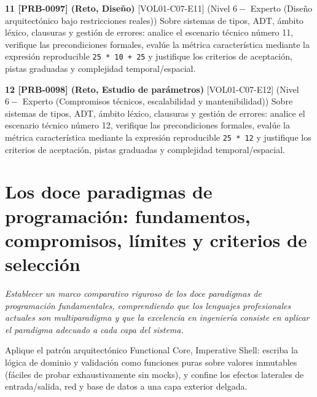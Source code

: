 \documentclass{book}
\begin{document}
\begin{tcolorbox}[title={Ejercicios}, studiumworked, breakable]
\noindent\textbf{11 [PRB-0097] (Reto, Diseño)}
[VOL01-C07-E11] (Nivel \(6 -\) Experto (Diseño arquitectónico bajo restricciones reales)) Sobre sistemas de tipos, ADT, ámbito léxico, clausuras y gestión de errores: analice el escenario técnico número 11, verifique las precondiciones formales, evalúe la métrica característica mediante la expresión reproducible \texttt{25 * 10 + 25} y justifique los criterios de aceptación, pistas graduadas y complejidad temporal/espacial.

\noindent\textbf{12 [PRB-0098] (Reto, Estudio de parámetros)}
[VOL01-C07-E12] (Nivel \(6 -\) Experto (Compromisos técnicos, escalabilidad y mantenibilidad)) Sobre sistemas de tipos, ADT, ámbito léxico, clausuras y gestión de errores: analice el escenario técnico número 12, verifique las precondiciones formales, evalúe la métrica característica mediante la expresión reproducible \texttt{25 * 12} y justifique los criterios de aceptación, pistas graduadas y complejidad temporal/espacial.
\end{tcolorbox}

\chapter{Los doce paradigmas de programación: fundamentos, compromisos, límites y criterios de selección}
\label{chap:cap08-los-doce-paradigmas-de-programacion}

\noindent\textit{Establecer un marco comparativo riguroso de los doce paradigmas de programación fundamentales, comprendiendo que los lenguajes profesionales actuales son multiparadigma y que la excelencia en ingeniería consiste en aplicar el paradigma adecuado a cada capa del sistema.}

\begin{tcolorbox}[title={Consejo}, studiumtip, breakable]

Aplique el patrón arquitectónico Functional Core, Imperative Shell: escriba la lógica de dominio y validación como funciones puras sobre valores inmutables (fáciles de probar exhaustivamente sin mocks), y confine los efectos laterales de entrada/salida, red y base de datos a una capa exterior delgada.
\end{tcolorbox}
\end{document}
